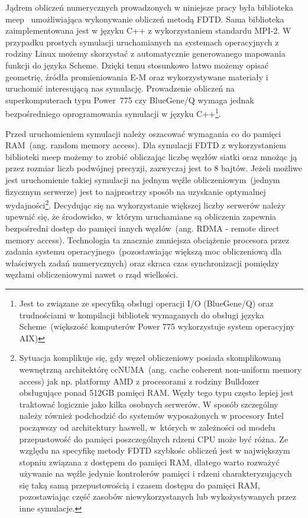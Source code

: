 Jądrem obliczeń numerycznych prowadzonych w niniejsze pracy była biblioteka meep~\cite{OskooiRo10} umożliwiająca wykonywanie obliczeń metodą FDTD. Sama biblioteka zaimplementowana jest w języku C++ z wykorzystaniem standardu MPI-2. W przypadku prostych symulacji uruchamianych na systemach operacyjnych z rodziny Linux możemy skorzystać z automatycznie generowanego mapowania funkcji do języka Scheme. Dzięki temu stosunkowo łatwo możemy opisać geometrię, źródła promieniowania E-M oraz wykorzystywane materiały i uruchomić interesującą nas symulację. Prowadzenie obliczeń na superkomputerach typu Power~775 czy BlueGene/Q wymaga jednak bezpośredniego oprogramowania symulacji w języku C++\footnote{Jest to związane ze specyfiką obsługi operacji I/O (BlueGene/Q) oraz trudnościami w kompilacji bibliotek wymaganych do obsługi języka Scheme~(większość komputerów Power 775 wykorzystuje system operacyjny AIX)}. 

Przed uruchomieniem symulacji należy oszacować wymagania co do pamięci RAM~(ang. random memory access). Dla symulacji FDTD z wykorzystaniem biblioteki meep możemy to zrobić obliczając liczbę węzłów siatki oraz mnożąc ją przez rozmiar liczb podwójnej precyzji, zazwyczaj jest to 8 bajtów. Jeżeli możliwe jest uruchomienie takiej symulacji na jednym węźle obliczeniowym~(jednym fizycznym serwerze) jest to najprostrzy sposób na uzyskanie optymalnej wydajności\footnote{Sytuacja komplikuje się, gdy węzeł obliczeniowy posiada skomplikowaną wewnętrzną architektórę ccNUMA~(ang. cache coherent non-uniform memory access) jak np. platformy AMD z procesorami z rodziny Bulldozer obsługujące ponad 512GB pamięci RAM. Węzły tego typu często lepiej jest traktować logicznie jako kilka osobnych serwerów. W sposób szczególny należy również podchodzić do systemów wyposażonych w procesory Intel począwszy od architektury haswell, w~których w zależności od modelu przepustowość do pamięci poszczególnych rdzeni CPU może być różna. Ze względu na specyfikę metody FDTD szybkośc obliczeń jest w największym stopniu związana z dostępem do pamięci RAM, dlatego warto rozważyć używanie na węźle jedynie kontrolerów pamięci i rdzeni charakteryzujących się taką samą przepustowością i czasem dostępu do pamięci RAM, pozostawiając część zasobów niewykorzystanych lub wykożystywanych przez inne symulacje.}. Decydując się na wykorzystanie większej liczby serwerów należy upewnić się, że środowisko, w~którym uruchamiane są obliczenia zapewnia bezpośredni dostęp do pamięci innych węzłów~(ang. RDMA - remote direct memory access). Technologia ta znacznie zmniejsza obciążenie procesora przez zadania systemu operacyjnego~(pozostawiając większą moc obliczeniową dla właściwych zadań numerycznych) oraz skraca czas synchronizacji pomiędzy węzłami obliczeniowymi nawet o rząd wielkości. 

